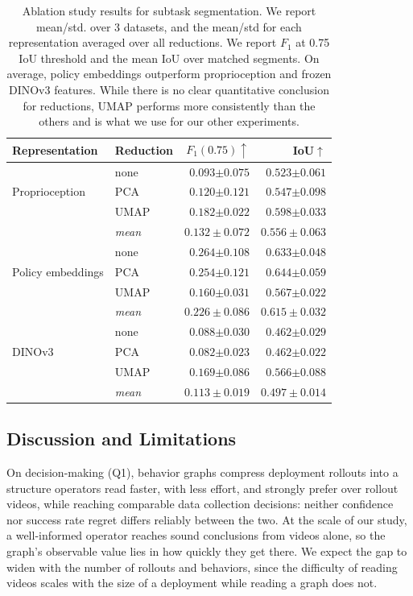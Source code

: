 \documentclass[letterpaper, 10 pt, conference]{ieeeconf}
\begin{document}
\begin{table}[t]
\vspace{5pt}
\centering\small
\caption{\small Ablation study results for subtask segmentation. We report mean/std. over 3 datasets, and the mean/std for each representation averaged over all reductions. We report $F_1$ at 0.75 IoU threshold and the mean IoU over matched segments. On average, policy embeddings outperform proprioception and frozen DINOv3 features. While there is no clear quantitative conclusion for reductions, UMAP performs more consistently than the others and is what we use for our other experiments.}
\setlength{\tabcolsep}{4pt}
\begin{tabular}{@{}ll rr@{}}
\toprule
Representation & Reduction & $F_1(0.75)\uparrow$ & IoU$\uparrow$ \\
\midrule
\multirow{3}{*}{Proprioception}
  & none & $0.093${$\pm0.075$} & $0.523${$\pm0.061$} \\
  & PCA  & $0.120${$\pm0.121$} & $0.547${$\pm0.098$} \\
  & UMAP & $0.182${$\pm0.022$} & $0.598${$\pm0.033$} \\

  & \emph{mean} & $0.132 \pm 0.072$ & $0.556 \pm 0.063$ \\
\midrule
\multirow{3}{*}{Policy embeddings}
  & none & $\mathbf{0.264}${$\pm0.108$} & $0.633${$\pm0.048$} \\
  & PCA  & $0.254${$\pm0.121$} & $\mathbf{0.644}${$\pm0.059$} \\
  & UMAP & $0.160${$\pm0.031$} & $0.567${$\pm0.022$} \\
  & \emph{mean} & $0.226 \pm 0.086$ & $0.615 \pm 0.032$ \\
\midrule
\multirow{3}{*}{DINOv3}
  & none & $0.088${$\pm0.030$} & $0.462${$\pm0.029$} \\
  & PCA  & $0.082${$\pm0.023$} & $0.462${$\pm0.022$} \\
  & UMAP & $0.169${$\pm0.086$} & $0.566${$\pm0.088$} \\
  & \emph{mean} & $0.113 \pm 0.019$ & $0.497 \pm 0.014$ \\
\bottomrule
\end{tabular}
\label{tab:ablation}
\end{table}

\subsection{Discussion and Limitations}
 
On decision-making (Q1), behavior graphs compress deployment rollouts into a structure operators read faster, with less effort, and strongly prefer over rollout videos, while reaching comparable data collection decisions: neither confidence nor success rate regret differs reliably between the two. At the scale of our study, a well-informed operator reaches sound conclusions from videos alone, so the graph's observable value lies in how quickly they get there. We expect the gap to widen with the number of rollouts and behaviors, since the difficulty of reading videos scales with the size of a deployment while reading a graph does not.
 
\end{document}
